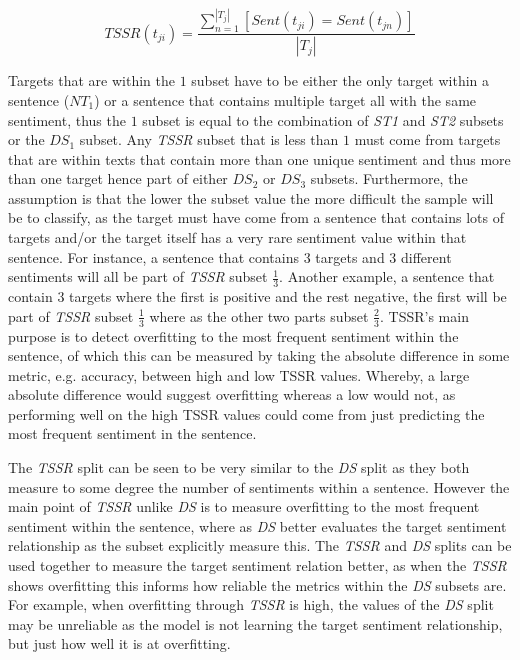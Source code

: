 \begin{equation}
TSSR(t_{ji}) = \frac{\sum_{n=1}^{|T_j|} [Sent(t_{ji})=Sent(t_{jn})]}{|T_j|}
\label{eq:aug_tssr}
\end{equation}

Targets that are within the $1$ subset have to be either the only target within a sentence ($NT_1$) or a sentence that contains multiple target all with the same sentiment, thus the $1$ subset is equal to the combination of \textit{ST1} and \textit{ST2} subsets or the $DS_1$ subset. Any \textit{TSSR} subset that is less than $1$ must come from targets that are within texts that contain more than one unique sentiment and thus more than one target hence part of either $DS_2$ or $DS_3$ subsets. Furthermore, the assumption is that the lower the subset value the more difficult the sample will be to classify, as the target must have come from a sentence that contains lots of targets and/or the target itself has a very rare sentiment value within that sentence. For instance, a sentence that contains 3 targets and 3 different sentiments will all be part of \textit{TSSR} subset $\frac{1}{3}$. Another example, a sentence that contain 3 targets where the first is positive and the rest negative, the first will be part of \textit{TSSR} subset $\frac{1}{3}$ where as the other two parts subset $\frac{2}{3}$. TSSR's main purpose is to detect overfitting to the most frequent sentiment within the sentence, of which this can be measured by taking the absolute difference in some metric, e.g. accuracy, between high and low TSSR values. Whereby, a large absolute difference would suggest overfitting whereas a low would not, as performing well on the high TSSR values could come from just predicting the most frequent sentiment in the sentence.

The \textit{TSSR} split can be seen to be very similar to the \textit{DS} split as they both measure to some degree the number of sentiments within a sentence. However the main point of \textit{TSSR} unlike \textit{DS} is to measure overfitting to the most frequent sentiment within the sentence, where as \textit{DS} better evaluates the target sentiment relationship as the subset explicitly measure this. The \textit{TSSR} and \textit{DS} splits can be used together to measure the target sentiment relation better, as when the \textit{TSSR} shows overfitting this informs how reliable the metrics within the \textit{DS} subsets are. For example, when overfitting through \textit{TSSR} is high, the values of the \textit{DS} split may be unreliable as the model is not learning the target sentiment relationship, but just how well it is at overfitting.

